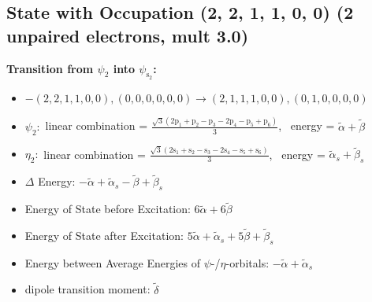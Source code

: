 \documentclass[12pt,a4paper]{article}
\begin{document}
\subsection*{State with Occupation (2, 2, 1, 1, 0, 0) (2 unpaired electrons, mult 3.0)}
        \noindent\textbf{Transition from $\psi_{2}$ into $\psi_{\text{s}_{2}}$:}
        \begin{itemize}
            \item $- (2, 2, 1, 1, 0, 0), (0, 0, 0, 0, 0, 0) \rightarrow (2, 1, 1, 1, 0, 0), (0, 1, 0, 0, 0, 0)$
        
            \item $\psi_{2}:$ linear combination = $\frac{\sqrt{3} \left(2 \text{p}_{1} + \text{p}_{2} - \text{p}_{3} - 2 \text{p}_{4} - \text{p}_{5} + \text{p}_{6}\right)}{3}$, \
            energy = $\tilde{\alpha} + \tilde{\beta}$
            
            \item $\eta_{2}:$ linear combination = $\frac{\sqrt{3} \left(2 \text{s}_{1} + \text{s}_{2} - \text{s}_{3} - 2 \text{s}_{4} - \text{s}_{5} + \text{s}_{6}\right)}{3}$, \
            energy = $\tilde{\alpha}_{s} + \tilde{\beta}_{s}$
            
                \item $\Delta$ Energy: $- \tilde{\alpha} + \tilde{\alpha}_{s} - \tilde{\beta} + \tilde{\beta}_{s}$
                \item Energy of State before Excitation: $6 \tilde{\alpha} + 6 \tilde{\beta}$
                \item Energy of State after Excitation: $5 \tilde{\alpha} + \tilde{\alpha}_{s} + 5 \tilde{\beta} + \tilde{\beta}_{s}$
                \item Energy between Average Energies of $\psi$-/$\eta$-orbitals: $- \tilde{\alpha} + \tilde{\alpha}_{s}$
            
            \item dipole transition moment: $\tilde{\delta}$
        
        \end{itemize}
        
\end{document}
